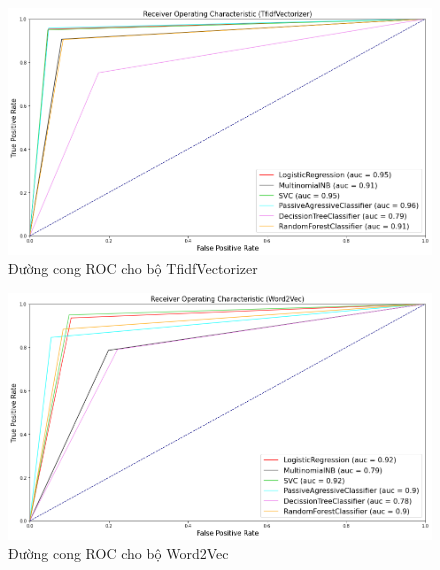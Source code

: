 \documentclass[12pt,a4paper,oneside]{book}
\begin{document}
	\begin{figure}[H]
		\includegraphics[width=1\textwidth]{tfroc}
		\caption{Đường cong ROC cho bộ TfidfVectorizer} 
	\end{figure}
	\hfill
	\begin{figure}[H]
		\includegraphics[width=1\textwidth]{w2vroc}
		\caption{Đường cong ROC cho bộ Word2Vec} 
	\end{figure}
	\pagebreak
\end{document}
